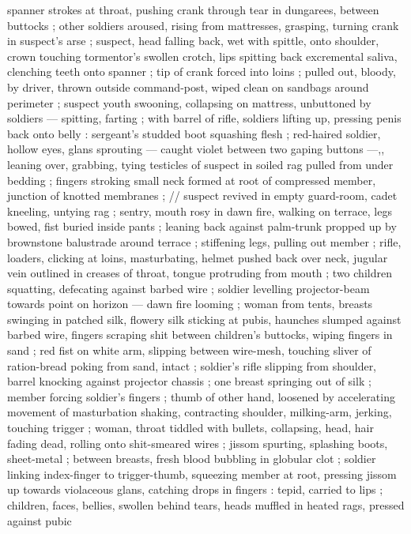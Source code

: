 spanner strokes at throat, pushing crank through tear in dungarees,
between buttocks ; other soldiers aroused, rising from mattresses,
grasping, turning crank in suspect's arse ; suspect, head falling back,
wet with spittle, onto shoulder, crown touching tormentor's swollen
crotch, lips spitting back excremental saliva, clenching teeth onto
spanner ; tip of crank forced into loins ; pulled out, bloody, by driver,
thrown outside command-post, wiped clean on sandbags around
perimeter ; suspect youth swooning, collapsing on mattress,
unbuttoned by soldiers --- spitting, farting ; with barrel of rifle,
soldiers lifting up, pressing penis back onto belly : sergeant's
studded boot squashing flesh ; red-haired soldier, hollow eyes, glans
sprouting --- caught violet between two gaping buttons ---,, leaning
over, grabbing, tying testicles of suspect in soiled rag pulled from
under bedding ; fingers stroking small neck formed at root of
compressed member, junction of knotted membranes ; // suspect
revived in empty guard-room, cadet kneeling, untying rag ; sentry,
mouth rosy in dawn fire, walking on terrace, legs bowed, fist buried
inside pants ; leaning back against palm-trunk propped up by
brownstone balustrade around terrace ; stiffening legs, pulling out %
member ; rifle, loaders, clicking at loins, masturbating, helmet
pushed back over neck, jugular vein outlined in creases of throat,
tongue protruding from mouth ; two children squatting, defecating
against barbed wire ; soldier levelling projector-beam towards point
on horizon --- dawn fire looming ; woman from tents, breasts
swinging in patched silk, flowery silk sticking at pubis, haunches
slumped against barbed wire, fingers scraping shit between
children's buttocks, wiping fingers in sand ; red fist on white arm,
slipping between wire-mesh, touching sliver of ration-bread poking
from sand, intact ; soldier's rifle slipping from shoulder, barrel
knocking against projector chassis ; one breast springing out of silk
; member forcing soldier's fingers ; thumb of other hand, loosened
by accelerating movement of masturbation shaking, contracting
shoulder, milking-arm, jerking, touching trigger ; woman, throat
tiddled with bullets, collapsing, head, hair fading dead, rolling onto
shit-smeared wires ; jissom spurting, splashing boots, sheet-metal ;
between breasts, fresh blood bubbling in globular clot ; soldier
linking index-finger to trigger-thumb, squeezing member at root,
pressing jissom up towards violaceous glans, catching drops in
fingers : tepid, carried to lips ; children, faces, bellies, swollen
behind tears, heads muffled in heated rags, pressed against pubic
